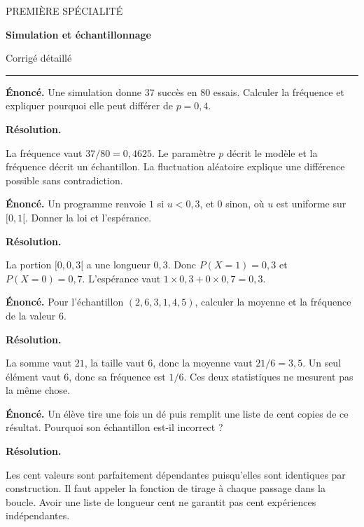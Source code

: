 \documentclass[11pt,a4paper]{article}
\begin{document}
{\small\color{Blue}PREMIÈRE SPÉCIALITÉ}\par{\LARGE\bfseries Simulation et échantillonnage}\par{\large Corrigé détaillé}\par\vspace{0.2cm}\hrule\vspace{0.4cm}
\par\noindent\begin{minipage}{\linewidth}
{\small\color{Muted}\textbf{Énoncé.} Une simulation donne $37$ succès en $80$ essais. Calculer la fréquence et expliquer pourquoi elle peut différer de $p=0,4$.}
\par\medskip
\textbf{Résolution.}\par
La fréquence vaut $37/80=0,4625$. Le paramètre $p$ décrit le modèle et la fréquence décrit un échantillon. La fluctuation aléatoire explique une différence possible sans contradiction.
\end{minipage}\par
\par\noindent\begin{minipage}{\linewidth}
{\small\color{Muted}\textbf{Énoncé.} Un programme renvoie $1$ si $u<0,3$, et $0$ sinon, où $u$ est uniforme sur $[0,1[$. Donner la loi et l’espérance.}
\par\medskip
\textbf{Résolution.}\par
La portion $[0,0,3[$ a une longueur $0,3$. Donc $P(X=1)=0,3$ et $P(X=0)=0,7$. L’espérance vaut $1\times0,3+0\times0,7=0,3$.
\end{minipage}\par
\par\noindent\begin{minipage}{\linewidth}
{\small\color{Muted}\textbf{Énoncé.} Pour l’échantillon $(2,6,3,1,4,5)$, calculer la moyenne et la fréquence de la valeur $6$.}
\par\medskip
\textbf{Résolution.}\par
La somme vaut $21$, la taille vaut $6$, donc la moyenne vaut $21/6=3,5$. Un seul élément vaut $6$, donc sa fréquence est $1/6$. Ces deux statistiques ne mesurent pas la même chose.
\end{minipage}\par
\par\noindent\begin{minipage}{\linewidth}
{\small\color{Muted}\textbf{Énoncé.} Un élève tire une fois un dé puis remplit une liste de cent copies de ce résultat. Pourquoi son échantillon est-il incorrect ?}
\par\medskip
\textbf{Résolution.}\par
Les cent valeurs sont parfaitement dépendantes puisqu’elles sont identiques par construction. Il faut appeler la fonction de tirage à chaque passage dans la boucle. Avoir une liste de longueur cent ne garantit pas cent expériences indépendantes.
\end{minipage}\par
\end{document}
